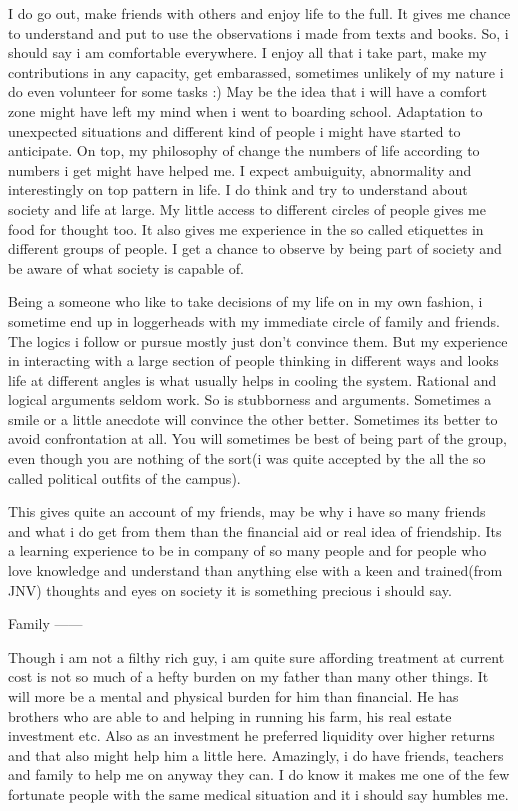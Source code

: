 I do go out, make friends with others and enjoy life to the full. It gives me chance to understand and put to use the observations i made from texts and books. So, i should say i am comfortable everywhere. I enjoy all that i take part, make my contributions in any capacity, get embarassed, sometimes unlikely of my nature i do even volunteer for some tasks :) May be the idea that i will have a comfort zone might have left my mind when i went to boarding school. Adaptation to unexpected situations and different kind of people i might have started to anticipate. On top, my philosophy of change the numbers of life according to numbers i get might have helped me. I expect ambuiguity, abnormality and interestingly on top pattern in life. I do think and try to understand about society and life at large. My little access to different circles of people gives me food for thought too. It also gives me experience in the so called etiquettes in different groups of people. I get a chance to observe by being part of society and be aware of what society is capable of. 

Being a someone who like to take decisions of my life on in my own fashion, i sometime end up in loggerheads with my immediate circle of family and friends. The logics i follow or pursue mostly just don't convince them. But my experience in interacting with a large section of people thinking in different ways and looks life at different angles is what usually helps in cooling the system. Rational and logical arguments seldom work. So is stubborness and arguments. Sometimes a smile or a little anecdote will convince the other better. Sometimes its better to avoid confrontation at all. You will sometimes be best of being part of the group, even though you are nothing of the sort(i was quite accepted by the all the so called political outfits of the campus). 

This gives quite an account of my friends, may be why i have so many friends and what i do get from them than the financial aid or real idea of friendship. Its a learning experience to be in company of so many people and for people who love knowledge and understand than anything else with a keen and trained(from JNV) thoughts and eyes on society it is something precious i should say.   


Family
------
   
Though i am not a filthy rich guy, i am quite sure affording treatment at current cost is not so much of a hefty burden on my father than many other things. It will more be a mental and physical burden for him than financial. He has brothers who are able to and helping in running his farm, his real estate investment etc. Also as an investment he preferred liquidity over higher returns and that also might help him a little here. Amazingly, i do have friends, teachers and family to help me on anyway they can. I do know it makes me one of the few fortunate people with the same medical situation and it i should say humbles me. 

